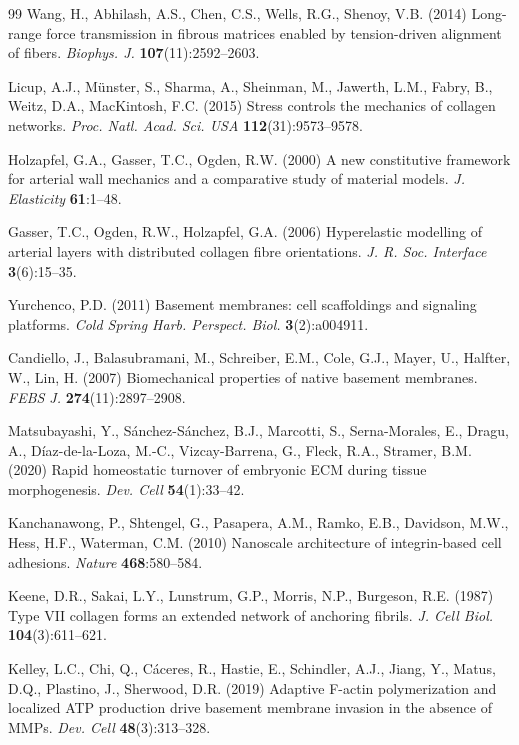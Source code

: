 \documentclass[10pt,a4paper]{article}
\begin{document}
{\begin{thebibliography}{99}
 Wang, H., Abhilash, A.S., Chen, C.S., Wells, R.G., Shenoy, V.B. (2014) Long-range
force transmission in fibrous matrices enabled by tension-driven alignment of fibers.
\emph{Biophys. J.} \textbf{107}(11):2592--2603.

 Licup, A.J., M\"unster, S., Sharma, A., Sheinman, M., Jawerth, L.M., Fabry, B.,
Weitz, D.A., MacKintosh, F.C. (2015) Stress controls the mechanics of collagen networks.
\emph{Proc. Natl. Acad. Sci. USA} \textbf{112}(31):9573--9578.

 Holzapfel, G.A., Gasser, T.C., Ogden, R.W. (2000) A new constitutive framework for
arterial wall mechanics and a comparative study of material models.
\emph{J. Elasticity} \textbf{61}:1--48.

 Gasser, T.C., Ogden, R.W., Holzapfel, G.A. (2006) Hyperelastic modelling of
arterial layers with distributed collagen fibre orientations.
\emph{J. R. Soc. Interface} \textbf{3}(6):15--35.

 Yurchenco, P.D. (2011) Basement membranes: cell scaffoldings and signaling
platforms. \emph{Cold Spring Harb. Perspect. Biol.} \textbf{3}(2):a004911.

 Candiello, J., Balasubramani, M., Schreiber, E.M., Cole, G.J., Mayer, U.,
Halfter, W., Lin, H. (2007) Biomechanical properties of native basement membranes.
\emph{FEBS J.} \textbf{274}(11):2897--2908.

 Matsubayashi, Y., S\'anchez-S\'anchez, B.J., Marcotti, S.,
Serna-Morales, E., Dragu, A., D\'iaz-de-la-Loza, M.-C., Vizcay-Barrena, G., Fleck, R.A.,
Stramer, B.M. (2020) Rapid homeostatic turnover of embryonic ECM during tissue morphogenesis.
\emph{Dev. Cell} \textbf{54}(1):33--42.

 Kanchanawong, P., Shtengel, G., Pasapera, A.M., Ramko, E.B.,
Davidson, M.W., Hess, H.F., Waterman, C.M. (2010) Nanoscale architecture of integrin-based cell
adhesions. \emph{Nature} \textbf{468}:580--584.

 Keene, D.R., Sakai, L.Y., Lunstrum, G.P., Morris, N.P., Burgeson, R.E. (1987)
Type VII collagen forms an extended network of anchoring fibrils.
\emph{J. Cell Biol.} \textbf{104}(3):611--621.

 Kelley, L.C., Chi, Q., C\'aceres, R., Hastie, E., Schindler, A.J., Jiang, Y.,
Matus, D.Q., Plastino, J., Sherwood, D.R. (2019) Adaptive F-actin polymerization and localized ATP
production drive basement membrane invasion in the absence of MMPs.
\emph{Dev. Cell} \textbf{48}(3):313--328.

\end{thebibliography}}
\end{document}
